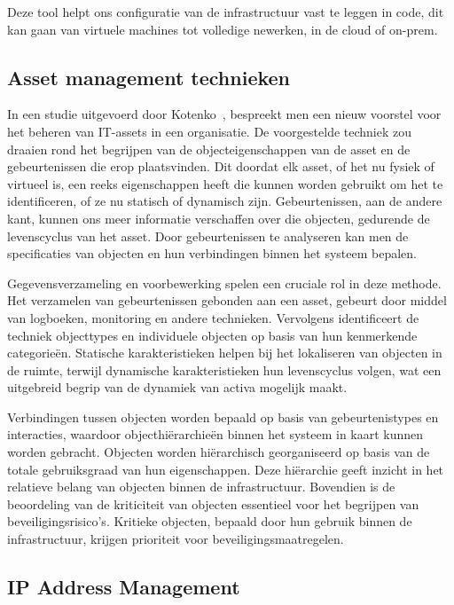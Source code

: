Deze tool helpt ons configuratie van de infrastructuur vast te leggen in code, dit kan gaan van virtuele machines tot volledige newerken, in de cloud of on-prem.

\subsection{Asset management technieken}%
\label{sub:asset-management-technieken}

In een studie uitgevoerd door Kotenko~\autocite{Kotenko2022}, bespreekt men een nieuw voorstel voor het beheren van IT-assets in een organisatie.
De voorgestelde techniek zou draaien rond het begrijpen van de objecteigenschappen van de asset en de gebeurtenissen die erop plaatsvinden.
Dit doordat elk asset, of het nu fysiek of virtueel is, een reeks eigenschappen heeft die kunnen worden gebruikt om het te identificeren, of ze nu statisch of dynamisch zijn.
Gebeurtenissen, aan de andere kant, kunnen ons meer informatie verschaffen over die objecten, gedurende de levenscyclus van het asset.
Door gebeurtenissen te analyseren kan men de specificaties van objecten en hun verbindingen binnen het systeem bepalen.

Gegevensverzameling en voorbewerking spelen een cruciale rol in deze methode.
Het verzamelen van gebeurtenissen gebonden aan een asset, gebeurt door middel van logboeken, monitoring en andere technieken.
Vervolgens identificeert de techniek objecttypes en individuele objecten op basis van hun kenmerkende categorie\"en.
Statische karakteristieken helpen bij het lokaliseren van objecten in de ruimte, terwijl dynamische karakteristieken hun levenscyclus volgen, wat een uitgebreid begrip van de dynamiek van activa mogelijk maakt.

Verbindingen tussen objecten worden bepaald op basis van gebeurtenistypes en interacties, waardoor objecthi\"erarchie\"en binnen het systeem in kaart kunnen worden gebracht.
Objecten worden hi\"erarchisch georganiseerd op basis van de totale gebruiksgraad van hun eigenschappen.
Deze hi\"erarchie geeft inzicht in het relatieve belang van objecten binnen de infrastructuur.
Bovendien is de beoordeling van de kriticiteit van objecten essentieel voor het begrijpen van beveiligingsrisico's.
Kritieke objecten, bepaald door hun gebruik binnen de infrastructuur, krijgen prioriteit voor beveiligingsmaatregelen.

\subsection{IP Address Management}
\label{sub:ipam}

